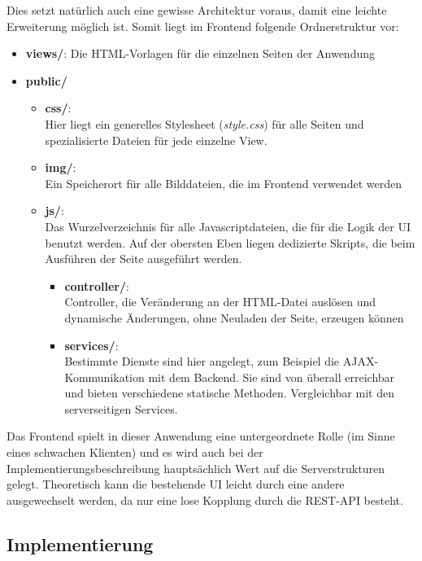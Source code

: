 Dies setzt natürlich auch eine gewisse Architektur voraus, damit eine leichte Erweiterung möglich ist. Somit liegt im Frontend folgende Ordnerstruktur vor:

\begin{itemize}
	\item \textbf{views/}: Die HTML-Vorlagen für die einzelnen Seiten der Anwendung
	\item \textbf{public/}
	\begin{itemize}
		\item \textbf{css/}:\\
		Hier liegt ein generelles Stylesheet (\textit{style.css}) für alle Seiten und spezialisierte Dateien für jede einzelne View.
		\item \textbf{img/}:\\
		Ein Speicherort für alle Bilddateien, die im Frontend verwendet werden
		\item \textbf{js/}:\\
		Das Wurzelverzeichnis für alle Javascriptdateien, die für die Logik der \ac{UI} benutzt werden. Auf der obersten Eben liegen dedizierte Skripts, die beim Ausführen der Seite ausgeführt werden.
		\begin{itemize}
			\item \textbf{controller/}:\\
			Controller, die Veränderung an der HTML-Datei auslösen und dynamische Änderungen, ohne Neuladen der Seite, erzeugen können 
			\item \textbf{services/}:\\
			Bestimmte Dienste sind hier angelegt, zum Beispiel die \gls{AJAX}-Kommunikation mit dem Backend. Sie sind von überall erreichbar und bieten verschiedene statische Methoden. Vergleichbar mit den serverseitigen Services.
		\end{itemize}
	\end{itemize}
\end{itemize}

Das Frontend spielt in dieser Anwendung eine untergeordnete Rolle (im Sinne eines schwachen Klienten) und es wird auch bei der Implementierungsbeschreibung hauptsächlich Wert auf die Serverstrukturen gelegt. Theoretisch kann die bestehende \ac{UI} leicht durch eine andere ausgewechselt werden, da nur eine lose Kopplung durch die \gls{REST}-API besteht.

\subsection{Implementierung}

